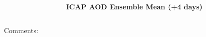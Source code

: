\documentclass[aspectratio=169, 10pt]{beamer}
\begin{document}
\begin{frame}
\begin{columns}
\begin{column}{0.5\textwidth}
\end{column}
\begin{column}{0.5\textwidth}

\vspace{-1.5cm}
\begin{figure}
\textbf{ICAP AOD Ensemble Mean (+4 days)}\vspace{.1cm}\\
\end{figure}

\end{column}
\end{columns}

\vspace{.1cm}
Comments:


\end{frame}
\end{document}
